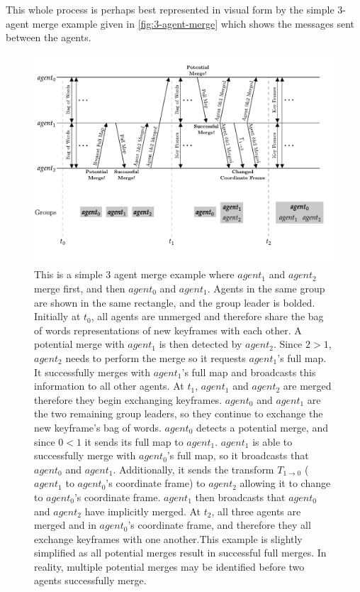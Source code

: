 This whole process is perhaps best represented in visual form by the simple 3-agent merge example given in \autoref{fig:3-agent-merge} which shows the messages sent between the agents.

\begin{figure}[h]
    \centering
    \captionsetup{format=plain}
    \includegraphics[]{figures/3_agent_merge.pdf}

    \caption{This is a simple 3 agent merge example where $agent_1$ and $agent_2$ merge first, and then $agent_0$ and $agent_1$. Agents in the same group are shown in the same rectangle, and the group leader is bolded. \captionbreak Initially at $t_0$, all agents are unmerged and therefore share the bag of words representations of new keyframes with each other. A potential merge with $agent_1$ is then detected by $agent_2$. Since $2>1$, $agent_2$ needs to perform the merge so it requests $agent_1$'s full map. It successfully merges with $agent_1$'s full map and broadcasts this information to all other agents. \captionbreak At $t_1$, $agent_1$ and $agent_2$ are merged therefore they begin exchanging keyframes. $agent_0$ and $agent_1$ are the two remaining group leaders, so they continue to exchange the new keyframe's bag of words. $agent_0$ detects a potential merge, and since $0<1$ it sends its full map to $agent_1$. $agent_1$ is able to successfully merge with $agent_0$'s full map, so it broadcasts that $agent_0$ and $agent_1$. Additionally, it sends the transform $T_{1 \to 0}$ ($agent_1$ to $agent_0$'s coordinate frame) to $agent_2$ allowing it to change to $agent_0$'s coordinate frame. $agent_1$ then broadcasts that $agent_0$ and $agent_2$ have implicitly merged. \captionbreak At $t_2$, all three agents are merged and in $agent_0$'s coordinate frame, and therefore they all exchange keyframes with one another.\captionbreak This example is slightly simplified as all potential merges result in successful full merges. In reality, multiple potential merges may be identified before two agents successfully merge.}
    \label{fig:3-agent-merge}
\end{figure}

